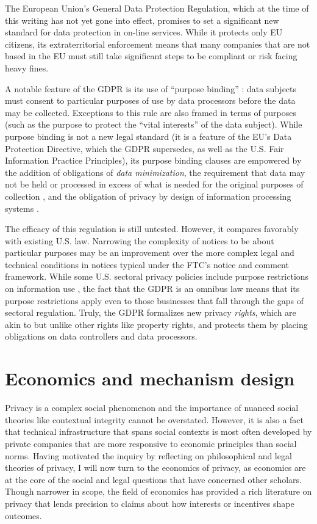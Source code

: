 \documentclass[../thesis.tex]{subfiles}
\begin{document}
The European Union's General Data Protection Regulation,
which at the time of this writing has not yet gone into
effect, promises to set a significant new standard for
data protection in on-line services.
While it protects only EU citizens, its extraterritorial
enforcement means that many companies that are not based in
the EU must still take significant steps to be compliant
or risk facing heavy fines.

A notable feature of the GDPR is its use of ``purpose binding''
\cite{hildebrandt2013slaves} \cite{herrmann2016privacy}:
data subjects must consent to particular purposes of use
by data processors before the data may be collected.
Exceptions to this rule are also framed in terms of purposes
(such as the purpose to protect the ``vital interests''
of the data subject).
While purpose binding is not a new legal standard
(it is a feature of the EU's Data Protection Directive,
which the GDPR supersedes, as well as the U.S. Fair
Information Practice Principles), its purpose binding
clauses are empowered by the addition of 
obligations of \emph{data minimization},
the requirement
that data may not be held or processed in excess of what
is needed for the original purposes of
collection \cite{gurses2011engineering},
and the obligation of privacy by design of information
processing systems \cite{danezis2015privacy}.

The efficacy of this regulation is still untested.
However, it compares favorably with existing U.S. law.
Narrowing the complexity of notices to be about particular
purposes may be an improvement over the
more complex legal and technical conditions in notices
typical under the FTC's notice and comment framework.
While some U.S. sectoral privacy policies include
purpose restrictions on information use
\cite{tschantz2012formalizing}, the fact that
the GDPR is an omnibus law means that its purpose
restrictions apply even to those businesses that
fall through the gaps of sectoral regulation.
Truly, the GDPR formalizes new privacy \emph{rights},
which are akin to but unlike other rights like
property rights, and protects them by placing
obligations on data controllers and data processors.


\section{Economics and mechanism design}
\label{sec:economics}

Privacy is a complex social phenomenon and the
importance of nuanced social theories like
contextual integrity cannot be overstated.
However, it is also a fact that technical
infrastructure that spans social contexts
is most often developed by private companies that are more
responsive to economic principles than social norms.
Having motivated the inquiry by reflecting on
philosophical and legal theories of privacy,
I will now turn to the economics of privacy,
as economics are at the core of the social and
legal questions that have concerned other scholars.
Though narrower in scope, the field of economics
has provided a rich
literature on privacy that lends precision to
claims about how interests
or incentives shape outcomes.
\end{document}
